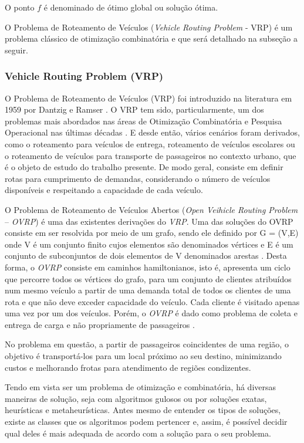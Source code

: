 O ponto \(f\) é denominado de ótimo global ou solução ótima.

O Problema de Roteamento de Veículos (\emph{Vehicle Routing Problem} - VRP) é um problema clássico de otimização combinatória e que será detalhado na subseção a seguir.

\subsubsection{Vehicle Routing Problem (VRP)} \label{vrp}

O Problema de Roteamento de Veículos (VRP) foi introduzido na literatura em 1959 por Dantzig e Ramser \cite{toth}. O VRP tem sido, particularmente, um dos problemas mais abordados nas áreas de Otimização Combinatória e Pesquisa Operacional nas últimas décadas \cite{steiner2000problema}. E desde então, vários cenários foram derivados, como o roteamento para veículos de entrega, roteamento de veículos escolares ou o roteamento de veículos para transporte de passageiros no contexto urbano, que é o objeto de estudo do trabalho presente. De modo geral, consiste em definir rotas para cumprimento de demandas, considerando o número de veículos disponíveis e respeitando a capacidade de cada veículo.

O Problema de Roteamento de Veículos Abertos (\emph{Open Veihicle Routing Problem} -- \emph{OVRP}) é uma das existentes derivações do \emph{VRP}. Uma das soluções do OVRP consiste em ser resolvida por meio de um grafo, sendo ele definido por G = (V,E) onde V é um conjunto finito cujos elementos são denominados vértices e E é um conjunto de subconjuntos de dois elementos de V denominados arestas \cite{nogueira2015introduccao}. Desta forma, o \emph{OVRP} consiste em caminhos hamiltonianos, isto é, apresenta um ciclo que percorre todos os vértices do grafo, para um conjunto de clientes atribuídos num mesmo veículo a partir de uma demanda total de todos os clientes de uma rota e que não deve exceder capacidade do veículo.  Cada cliente é visitado apenas uma vez por um dos veículos. Porém, o \emph{OVRP} é dado como problema de coleta e entrega de carga e não propriamente de passageiros \cite{BRANDAO2004552}.

No problema em questão, a partir de passageiros coincidentes de uma região, o objetivo é transportá-los para um local próximo ao seu destino, minimizando custos e melhorando frotas para atendimento de regiões condizentes. 

Tendo em vista ser um problema de otimização e combinatória, há diversas maneiras de solução, seja com algoritmos gulosos ou por soluções exatas, heurísticas e metaheurísticas. Antes mesmo de entender os tipos de soluções, existe as classes que os algoritmos podem pertencer e, assim, é possível decidir qual deles é mais adequada de acordo com a solução para o seu problema.

